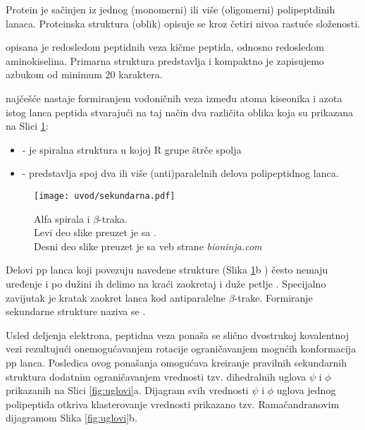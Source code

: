 Protein je sačinjen iz jednog (monomerni) ili više (oligomerni) polipeptdinih lanaca.
Proteinska struktura (oblik) opisuje se kroz četiri nivoa rastuće složenosti.

 opisana je redosledom peptidnih veza kičme peptida,
odnosno redosledom aminokiselina. Primarna struktura predstavlja  i kompaktno je zapisujemo azbukom od minimum 20 karaktera.

 najčešće nastaje formiranjem vodoničnih veza
između atoma kiseonika i azota istog lanca peptida stvarajući na taj način
dva različita oblika koja su prikazana na Slici \ref{fig:sekundarna}:
\begin{itemize}
  \item {} - je spiralna struktura u kojoj R grupe štrče spolja
  \item {}  - predstavlja spoj dva ili više (anti)paralelnih delova polipeptidnog lanca.
\end{itemize}

\begin{figure}[th]
\centering
\hspace*{-2.0cm} 
\texttt{[image: uvod/sekundarna.pdf]}
\caption {
  Alfa spirala i $\beta$-traka.\\ \footnotesize Levi deo slike preuzet je sa \parencite{sekundarna_ref}.\\
  Desni deo slike preuzet je sa veb strane \textit{bioninja.com}
}
\label{fig:sekundarna}
\end{figure}

Delovi pp lanca  koji povezuju navedene strukture (Slika \ref{fig:sekundarna}b ) često nemaju uređenje i po dužini ih delimo na kraći zaokretaj i duže
petlje . Specijalno zavijutak  je
kratak zaokret lanca kod antiparalelne $\beta$-trake.
Formiranje sekundarne strukture naziva se .

Usled deljenja elektrona,  peptidna veza ponaša se slično dvostrukoj kovalentnoj
vezi rezultujući onemogućavanjem rotacije ograničavanjem mogućih konformacija pp lanca.
Posledica ovog ponašanja omogućava kreiranje pravilnih sekundarnih struktura
dodatnim ograničavanjem vrednosti tzv.  dihedralnih uglova $\psi$ i $\phi$ prikazanih
na Slici \ref{fig:uglovi}a.  Dijagram svih vrednosti $\psi$ i $\phi$ uglova
jednog polipeptida otkriva klasterovanje vrednosti prikazano tzv. Ramačandranovim
dijagramom Slika \ref{fig:uglovi}b.

